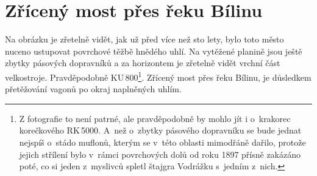 
\def\poznamka{Z fotografie to není patrné, ale pravděpodobně by mohlo jít i
o~krakorec korečkového RK\,5000. A~než o~zbytky pásového dopravníku se bude
jednat nejspíš o~stádo muflonů, kterým se v~této oblasti mimodřáně dařilo,
protože jejich střílení bylo v~rámci povrchových dolů od roku 1897 přísně
zakázáno poté, co si jeden z~myslivců spletl štajgra Vodrážku s~jedním z~nich.}

\chapter{Zřícený most přes řeku Bílinu}


Na obrázku je zřetelně vidět, jak už před více než sto lety, bylo toto město
nuceno ustupovat povrchové těžbě hnědého uhlí. Na vytěžené planině jsou ještě
zbytky pásových dopravníků a za horizontem je zřetelně vidět vrchní část
velkostroje. Pravděpodobně KU\,800\footnote{\poznamka}. Zřícený most přes řeku
Bílinu, je důsledkem přetěžování vagonů po okraj naplněných uhlím.

